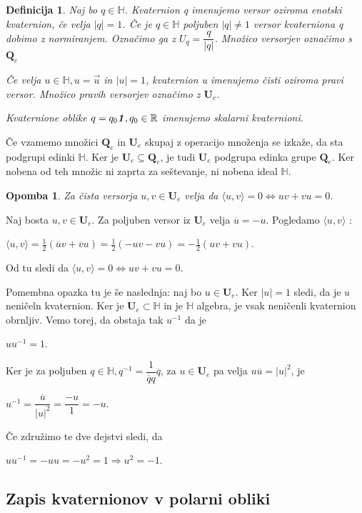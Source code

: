 \documentclass[a4paper,12pt]{article}
\def\R{\mathbb{R}} %
\def\H{\mathbb{H}} %
\def\Qe{\textbf{Q}_{e}} %
\def\Ue{\textbf{U}_{e}} %
\def\1{\textbf{\emph{1}}}
\newcommand{\dotpr}[2]{\langle #1, #2 \rangle}
\newtheorem{opomba}{Opomba}
\newtheorem{definicija}{Definicija}
\begin{document}
\begin{definicija}
   Naj bo $q \in \H$. Kvaternion q imenujemo \emph{versor} oziroma \emph{enotski kvaternion}, če velja
   $|q| = 1$. Če je $q \in \H$ poljuben $|q| \neq 1$ versor kvaterniona q dobimo z normiranjem. Označimo ga z $U_{q} = \dfrac{q}{|q|}$. 
   Množico versorjev označimo s $\Qe$

   Če velja $u \in \H, u = \vec{u}$ in $|u| = 1$, kvaternion u imenujemo \emph{čisti} oziroma \emph{pravi} versor.
   Množico pravih versorjev označimo z $\Ue$.

   Kvaternione oblike $q = q_{0}\1, q_{0} \in \R$ imenujemo \emph{skalarni kvaternioni.}
\end{definicija}
Če vzamemo množici $\Qe$ in $\Ue$ skupaj z operacijo množenja se izkaže, da sta podgrupi edinki $\H$.
Ker je $\Ue \subseteq \Qe$, je tudi $\Ue$ podgrupa edinka grupe $\Qe$. Ker nobena od teh množic ni zaprta za seštevanje, ni nobena ideal $\H$.
\begin{opomba}
   Za čista versorja $u, v \in \Ue$ velja da $\dotpr{u}{v} = 0 \iff uv + vu = 0$.
\end{opomba}
Naj bosta $u, v \in \Ue$. Za poljuben versor iz $\Ue$ velja $\overline{u} = -u$. Pogledamo $\dotpr{u}{v}$ :
\begin{center}
   $\dotpr{u}{v} = \frac{1}{2}(\overline{u}v + \overline{v}u) = \frac{1}{2}(-uv -vu) = -\frac{1}{2}(uv + vu)$.
\end{center}
Od tu sledi da $\dotpr{u}{v} = 0 \iff uv + vu = 0$.

\break
Pomembna opazka tu je še naslednja: naj bo $u \in \Ue$. Ker $|u| = 1$ sledi, da je $u$ neničeln kvaternion.
Ker je $\Ue \subset \H$ in je $\H$ algebra, je vsak neničenli kvaternion obrnljiv. Vemo torej, da obstaja tak $u^{-1}$ da je
\begin{center}
   $uu^{-1} = 1$.
\end{center}
Ker je za poljuben $q \in \H, q^{-1} = \dfrac{1}{\overline{q}q} \overline{q}$, za $u \in \Ue$ pa velja $u\overline{u} = |u|^2$, je 
\begin{center}
   $u^{-1} = \dfrac{\overline{u}}{|u|^2} = \dfrac{-u}{1} = -u$.
\end{center}
Če združimo te dve dejstvi sledi, da
\begin{center}
   $uu^{-1} = -uu = -u^2 = 1 \Rightarrow u^2 = -1$.
\end{center}

\subsection{Zapis  kvaternionov v polarni obliki}
\end{document}
